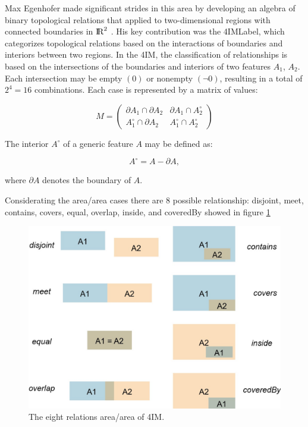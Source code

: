 Max Egenhofer made significant strides in this area by developing an algebra of binary topological relations that applied to two-dimensional regions with connected boundaries in ${\rm I\!R}^2$ \cite{egenhoferFormalDefinitionBinary1989}. His key contribution was the \acrfull{4IMLabel}, which categorizes topological relations based on the interactions of boundaries and interiors between two regions. In the 4IM, the classification of relationships is based on the intersections of the boundaries and interiors of two features $A_1$, $A_2$. Each intersection may be empty $(0)$ or nonempty $(\neg 0)$, resulting in a total of $2^4 = 16$ combinations. Each case is represented by a matrix of values:

\begin{equation}
M = 
\begin{pmatrix} 
\partial A_1 \cap \partial A_2 & \partial A_1 \cap A_2^{\circ} \\ 
A_1^{\circ} \cap \partial A_2 & A_1^{\circ} \cap A_2^{\circ} 
\end{pmatrix}
\end{equation}

The interior $A^{\circ}$ of a generic feature $A$ may be defined as:

\begin{equation}
A^{\circ} = A - \partial A,
\end{equation}

where $\partial A$ denotes the boundary of $A$.

Considerating the area/area cases there are 8 possible relationship: disjoint, meet, contains, covers, equal, overlap, inside, and coveredBy showed in figure \ref{fig:4IM}

\begin{figure}[h!tb]
    \centerline {\includegraphics[width=\textwidth]{img/4IM.jpg}}
    \caption{The eight relations area/area of 4IM.}
    \label{fig:4IM}
\end{figure}

